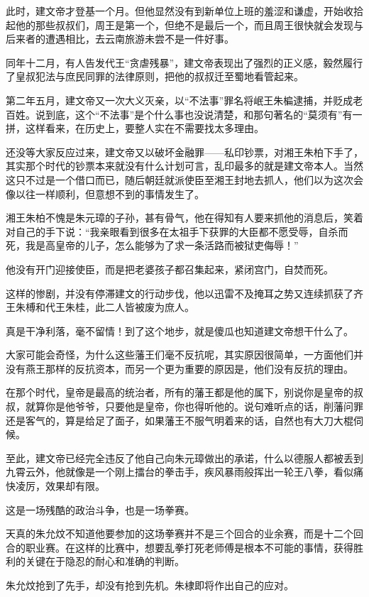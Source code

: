 \begin{multicols}{\theparacolNo}
		此时，建文帝才登基一个月。但他显然没有到新单位上班的羞涩和谦虚，开始收拾起他的那些叔叔们，周王是第一个，但绝不是最后一个，而且周王很快就会发现与后来者的遭遇相比，去云南旅游未尝不是一件好事。

		同年十二月，有人告发代王“贪虐残暴”，建文帝表现出了强烈的正义感，毅然履行了皇叔犯法与庶民同罪的法律原则，把他的叔叔迁至蜀地看管起来。

		第二年五月，建文帝又一次大义灭亲，以“不法事”罪名将岷王朱楄逮捕，并贬成老百姓。说到底，这个“不法事”是个什么事也没说清楚，和那句著名的“莫须有”有一拼，这样看来，在历史上，要整人实在不需要找太多理由。

		还没等大家反应过来，建文帝又以破坏金融罪——私印钞票，对湘王朱柏下手了，其实那个时代的钞票本来就没有什么计划可言，乱印最多的就是建文帝本人。当然这只不过是一个借口而已，随后朝廷就派使臣至湘王封地去抓人，他们以为这次会像以往一样顺利，但意想不到的事情发生了。

		湘王朱柏不愧是朱元璋的子孙，甚有骨气，他在得知有人要来抓他的消息后，笑着对自己的手下说：“我亲眼看到很多在太祖手下获罪的大臣都不愿受辱，自杀而死，我是高皇帝的儿子，怎么能够为了求一条活路而被狱吏侮辱！”

		他没有开门迎接使臣，而是把老婆孩子都召集起来，紧闭宫门，自焚而死。

		这样的惨剧，并没有停滞建文的行动步伐，他以迅雷不及掩耳之势又连续抓获了齐王朱榑和代王朱桂，此二人皆被废为庶人。

		真是干净利落，毫不留情！到了这个地步，就是傻瓜也知道建文帝想干什么了。

		大家可能会奇怪，为什么这些藩王们毫不反抗呢，其实原因很简单，一方面他们并没有燕王那样的反抗资本，而另一个更为重要的原因是，他们没有反抗的理由。

		在那个时代，皇帝是最高的统治者，所有的藩王都是他的属下，别说你是皇帝的叔叔，就算你是他爷爷，只要他是皇帝，你也得听他的。说句难听点的话，削藩问罪还是客气的，算是给足了面子，如果藩王不服气明着来的话，自然也有大刀大棍伺候。

		至此，建文帝已经完全违反了他自己向朱元璋做出的承诺，什么以德服人都被丢到九霄云外，他就像是一个刚上擂台的拳击手，疾风暴雨般挥出一轮王八拳，看似痛快凌厉，效果却有限。

		这是一场残酷的政治斗争，也是一场拳赛。

		天真的朱允炆不知道他要参加的这场拳赛并不是三个回合的业余赛，而是十二个回合的职业赛。在这样的比赛中，想要乱拳打死老师傅是根本不可能的事情，获得胜利的关键在于隐忍的耐心和准确的判断。

		朱允炆抢到了先手，却没有抢到先机。朱棣即将作出自己的应对。
		\ifnum{}
	\end{multicols}
\fi
\newpage
